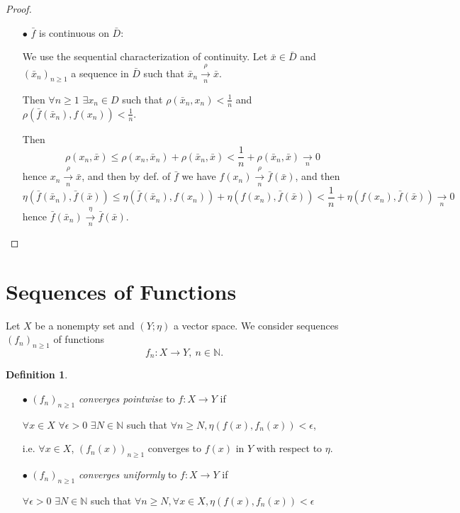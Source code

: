 \documentclass[12pt]{amsbook}
\theoremstyle{definition}
\newtheorem{definition}[theorem]{Definition}
\newcommand{\NN}{{\mathbb N}}
\newcommand{\ra}{\rightarrow} %
\begin{document}
\begin{proof}
\begin{itemize}
\begin{itemize}
\item[$\bullet$] $\bar f$ is continuous on $\bar D$:

We use the sequential characterization of continuity. Let $\bar x \in \bar D$ and $(\bar x_n)_{n \geq 1}$ a sequence in $\bar D$ such that $\bar x_n \xrightarrow[n]{\rho} \bar x$.

Then $\forall n \geq 1$ $\exists x_n \in D$ such that $\rho(\bar x_n, x_n) < \frac{1}{n}$ and $\rho(\bar f(\bar x_n), f(x_n)) < \frac{1}{n}$. %

Then
\begin{equation*}
\rho(x_n, \bar x) \leq \rho(x_n, \bar x_n) + \rho(\bar x_n, \bar x) < \frac{1}{n} + \rho(\bar x_n, \bar x) \xrightarrow[n]{} 0
\end{equation*}
hence $x_n \xrightarrow[n]\rho \bar x$, and then by def. of $\bar f$ we have $f(x_n) \xrightarrow[n]\rho \bar f(\bar x)$, and then
\begin{equation*}
\eta(\bar f(\bar x_n), \bar f(\bar x)) \leq \eta(\bar f(\bar x_n), f(x_n)) + \eta(f(x_n), \bar f(\bar x)) < \frac{1}{n} + \eta(f(x_n), \bar f(\bar x)) \xrightarrow[n]{} 0
\end{equation*}
hence $\bar f(\bar x_n) \xrightarrow[n]\eta \bar f(\bar x)$.
\end{itemize}
\end{itemize}
\end{proof}

\section{Sequences of Functions}

Let $X$ be a nonempty set and $(Y; \eta)$ a vector space. We consider sequences $(f_n)_{n \geq 1}$ of functions
\begin{equation*} f_n: X \ra Y, \ n \in \NN. \end{equation*}

\begin{definition}
\begin{itemize}
\item[$\bullet$] $(f_n)_{n \geq 1}$ \emph{converges pointwise} to $f: X \ra Y$ if 

$\forall x \in X$ $\forall \epsilon > 0$ $\exists N \in \NN$ such that $\forall n \geq N, \eta(f(x),f_n(x)) < \epsilon$,

i.e. $\forall x \in X$, $(f_n(x))_{n \geq 1}$ converges to $f(x)$ in $Y$ with respect to $\eta$.

\item[$\bullet$] $(f_n)_{n \geq 1}$ \emph{converges uniformly} to $f: X \ra Y$ if 

$\forall \epsilon > 0$ $\exists N \in \NN$ such that $\forall n \geq N, \forall x \in X, \eta(f(x),f_n(x)) < \epsilon$
\end{itemize}
\end{definition}
\end{document}
